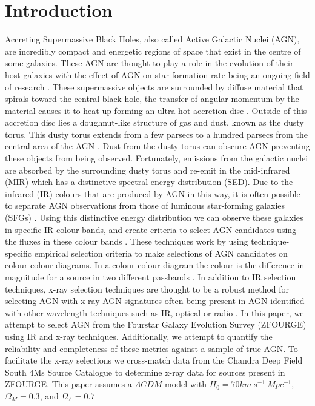 \documentclass[11pt]{iopart}
\begin{document}
\section{Introduction}
Accreting Supermassive Black Holes, also called Active Galactic Nuclei (AGN), are incredibly compact and energetic regions of space that exist in the centre of some galaxies. These AGN are thought to play a role in the evolution of their host galaxies with the effect of AGN on star formation rate being an ongoing field of research \cite{cowley_zfourge_2016}. These supermassive objects are surrounded by diffuse material that spirals toward the central black hole, the transfer of angular momentum by the material causes it to heat up forming an ultra-hot accretion disc \cite{shakura_black_1973}. Outside of this accretion disc lies a doughnut-like structure of gas and dust, known as the dusty torus. This dusty torus extends from a few parsecs to a hundred parsecs from the central area of the AGN \cite{netzer_revisiting_2015}. Dust from the dusty torus can obscure AGN preventing these objects from being observed. Fortunately, emissions from the galactic nuclei are absorbed by the surrounding dusty torus and re-emit in the mid-infrared (MIR) which has a distinctive spectral energy distribution (SED)\cite{lyu_polar_2018}. Due to the infrared (IR) colours that are produced by AGN in this way, it is often possible to separate AGN observations from those of luminous star-forming galaxies (SFGs) \cite{hickox_obscured_2018}. Using this distinctive energy distribution we can observe these galaxies in specific IR colour bands, and create criteria to select AGN candidates using the fluxes in these colour bands \cite{lacy_obscured_2004, stern_midinfrared_2005, donley_identifying_2012, messias_new_2012}. These techniques work by using technique-specific empirical selection criteria to make selections of AGN candidates on colour-colour diagrams. In a colour-colour diagram the colour is the difference in magnitude for a source in two different passbands \cite{bessell_ubvri_1990}. In addition to IR selection techniques, x-ray selection techniques are thought to be a robust method for selecting AGN with x-ray AGN signatures often being present in AGN identified with other wavelength techniques such as IR, optical or radio \cite{brandt_cosmic_2015}. In this paper, we attempt to select AGN from the Fourstar Galaxy Evolution Survey (ZFOURGE) \cite{straatman_fourstar_2016} using IR and x-ray techniques. Additionally, we attempt to quantify the reliability and completeness of these metrics against a sample of true AGN. To facilitate the x-ray selections we cross-match data from the Chandra Deep Field South 4Ms Source Catalogue \cite{xue_chandra_2011} to determine x-ray data for sources present in ZFOURGE. This paper assumes a $\Lambda CDM$ model with $H_0 = 70 km \ s^{-1} \ Mpc^{-1}$, $\Omega_M = 0.3$, and $\Omega_{\Lambda} = 0.7$ 
\end{document}
